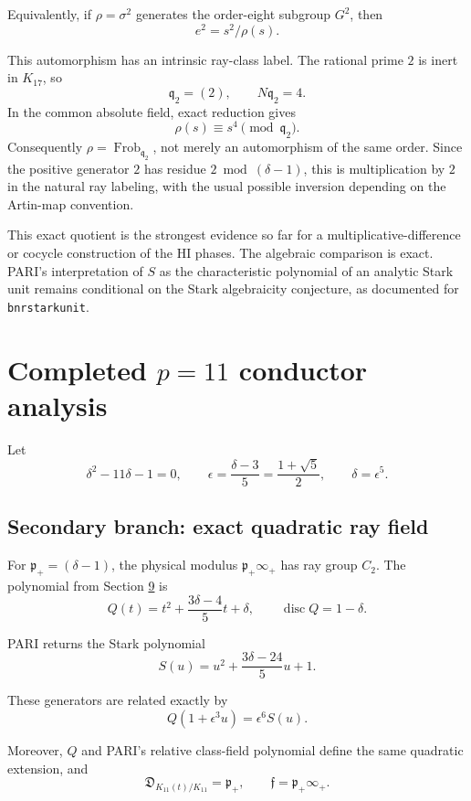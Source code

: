 \documentclass[11pt,reqno]{amsart}
\theoremstyle{plain}
\begin{document}
Equivalently, if \(\rho=\sigma^2\) generates the order-eight subgroup \(G^2\), then
\[
e^2=s^2/\rho(s).
\]

This automorphism has an intrinsic ray-class label. The rational prime \(2\) is inert in \(K_{17}\), so
\[
\mathfrak q_2=(2),
\qquad
N\mathfrak q_2=4.
\]
In the common absolute field, exact reduction gives
\[
\rho(s)\equiv s^4\pmod{\mathfrak q_2}.
\]
Consequently \(\rho=\operatorname{Frob}_{\mathfrak q_2}\), not merely an automorphism of the same order. Since the positive generator \(2\) has residue \(2\bmod(\delta-1)\), this is multiplication by \(2\) in the natural ray labeling, with the usual possible inversion depending on the Artin-map convention.

This exact quotient is the strongest evidence so far for a multiplicative-difference or cocycle construction of the HI phases. The algebraic comparison is exact. PARI's interpretation of \(S\) as the characteristic polynomial of an analytic Stark unit remains conditional on the Stark algebraicity conjecture, as documented for \texttt{bnrstarkunit}.

\section{\texorpdfstring{Completed \(p=11\) conductor analysis}{Completed p=11 conductor analysis}}\label{sec:22}

Let
\[
\delta^2-11\delta-1=0,
\qquad
\epsilon=\frac{\delta-3}{5}=\frac{1+\sqrt5}{2},
\qquad
\delta=\epsilon^5.
\]

\subsection{Secondary branch: exact quadratic ray field}\label{sec:22.1}

For \(\mathfrak p_+=(\delta-1)\), the physical modulus \(\mathfrak p_+\infty_+\) has ray group \(C_2\). The polynomial from Section \hyperref[sec:9]{9} is
\[
Q(t)=t^2+\frac{3\delta-4}{5}t+\delta,
\qquad
\operatorname{disc}Q=1-\delta.
\]

PARI returns the Stark polynomial
\[
S(u)=u^2+\frac{3\delta-24}{5}u+1.
\]

These generators are related exactly by
\[
\boxed{
Q(1+\epsilon^3u)=\epsilon^6S(u).
}
\]

Moreover, \(Q\) and PARI's relative class-field polynomial define the same quadratic extension, and
\[
\mathfrak D_{K_{11}(t)/K_{11}}=\mathfrak p_+,
\qquad
\mathfrak f=\mathfrak p_+\infty_+.
\]
\end{document}

